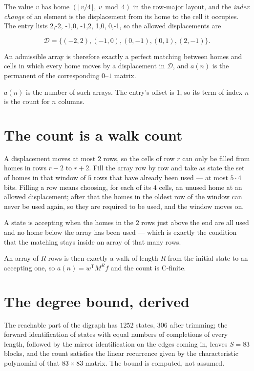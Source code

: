 \documentclass[11pt]{article}
\theoremstyle{definition}
\begin{document}
The value $v$ has home $(\lfloor v/4\rfloor,\ v \bmod 4)$ in the row-major layout, and the {\itshape index change} of an element is the displacement from its home to the cell it occupies. The entry lists 2,-2, -1,0, -1,2, 1,0, 0,-1, so the allowed displacements are

\[\mathcal{D} = \{(-2,2), (-1,0), (0,-1), (0,1), (2,-1)\}.\]

An admissible array is therefore exactly a perfect matching between homes and cells in which every home moves by a displacement in $\mathcal{D}$, and $a(n)$ is the permanent of the corresponding $0$--$1$ matrix.

$a(n)$ is the number of such arrays. The entry's offset is 1, so its term of index $n$ is the count for $n$ columns.

\section{The count is a walk count}

A displacement moves at most $2$ rows, so the cells of row $r$ can only be filled from homes in rows $r-2$ to $r+2$. Fill the array row by row and take as state the set of homes in that window of $5$ rows that have already been used --- at most $5\cdot4$ bits. Filling a row means choosing, for each of its $4$ cells, an unused home at an allowed displacement; after that the homes in the oldest row of the window can never be used again, so they are required to be used, and the window moves on.

A state is accepting when the homes in the $2$ rows just above the end are all used and no home below the array has been used --- which is exactly the condition that the matching stays inside an array of that many rows.

An array of $R$ rows is then exactly a walk of length $R$ from the initial state to an accepting one, so $a(n) = w^{\mathsf T}M^{R}f$ and the count is C-finite.

\section{The degree bound, derived}

The reachable part of the digraph has $1252$ states, $306$ after trimming; the forward identification of states with equal numbers of completions of every length, followed by the mirror identification on the edges coming in, leaves $S = 83$ blocks, and the count satisfies the linear recurrence given by the characteristic polynomial of that $83\times83$ matrix. The bound is computed, not assumed.
\end{document}
